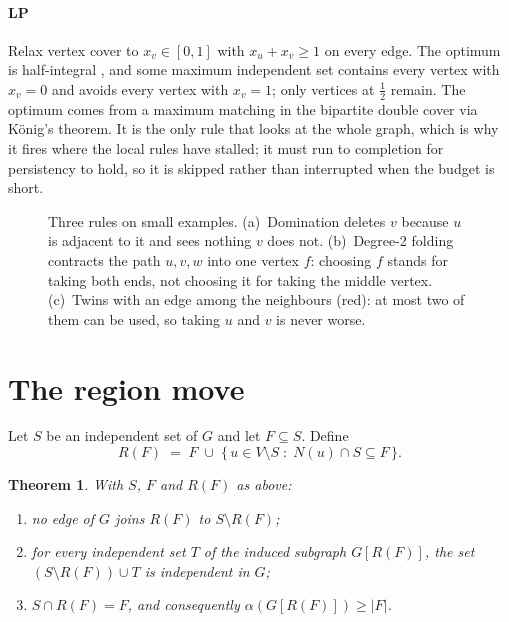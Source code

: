 \documentclass[pdflatex,sn-mathphys-num]{sn-jnl}
\theoremstyle{thmstyleone}%
\newtheorem{theorem}{Theorem}%
\theoremstyle{thmstyletwo}%
\begin{document}
\paragraph{LP} Relax vertex cover to $x_v\in[0,1]$ with $x_u+x_v\ge 1$ on every
edge. The optimum is half-integral \citep{nemhauser1975}, and some maximum
independent set contains every vertex with $x_v=0$ and avoids every vertex with
$x_v=1$; only vertices at $\tfrac12$ remain. The optimum comes from a maximum
matching in the bipartite double cover via K\"onig's theorem. It is the only rule
that looks at the whole graph, which is why it fires where the local rules have
stalled; it must run to completion for persistency to hold, so it is skipped
rather than interrupted when the budget is short.

\begin{figure}[htbp]
\centering
\resizebox{0.8\textwidth}{!}{}
\caption{Three rules on small examples. (a)~Domination deletes $v$ because $u$ is
adjacent to it and sees nothing $v$ does not. (b)~Degree-2 folding contracts the
path $u,v,w$ into one vertex $f$: choosing $f$ stands for taking both ends, not
choosing it for taking the middle vertex. (c)~Twins with an edge among the
neighbours (red): at most two of them can be used, so taking $u$ and $v$ is never
worse.}
\label{fig:rules}
\end{figure}

\section{The region move}
\label{sec:move}

Let $S$ be an independent set of $G$ and let $F \subseteq S$. Define
\begin{equation}
R(F) \;=\; F \;\cup\; \{\, u \in V \setminus S \;:\; N(u) \cap S \subseteq F \,\}.
\label{eq:region}
\end{equation}

\begin{theorem}
\label{thm:region}
With $S$, $F$ and $R(F)$ as above:
\begin{enumerate}
\item[(a)] no edge of $G$ joins $R(F)$ to $S \setminus R(F)$;
\item[(b)] for every independent set $T$ of the induced subgraph $G[R(F)]$, the
      set $(S \setminus R(F)) \cup T$ is independent in $G$;
\item[(c)] $S \cap R(F) = F$, and consequently $\alpha(G[R(F)]) \ge |F|$.
\end{enumerate}
\end{theorem}
\end{document}
